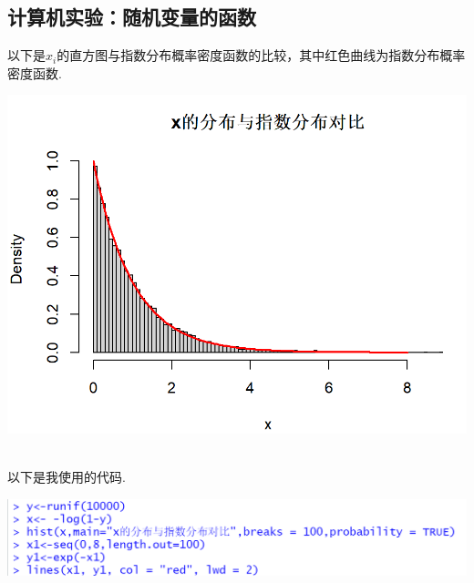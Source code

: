 \documentclass{article}
\begin{document}
\begin{CJK}{UTF8}{gbsn}
\section{计算机实验：随机变量的函数}
以下是$x_{i}$的直方图与指数分布概率密度函数的比较，其中红色曲线为指数分布概率密度函数.
\\
\begin{minipage}{0.5\textwidth}
    \includegraphics[scale=0.6]{plot.png}
\end{minipage}
\\
以下是我使用的代码.
\\
\begin{minipage}{0.5\textwidth}
    \includegraphics[scale=0.6]{code.png}
\end{minipage}
\end{CJK}
\end{document}
